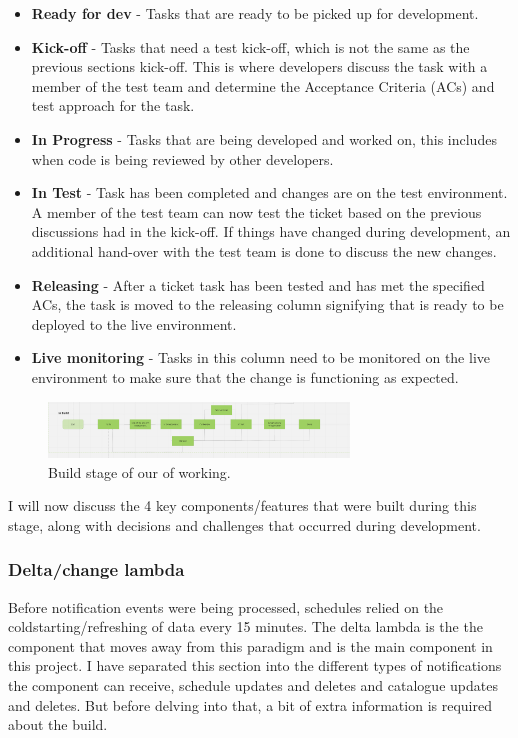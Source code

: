   \begin{itemize}
    \item \textbf{Ready for dev} - Tasks that are ready to be picked up for development.
    \item \textbf{Kick-off} - Tasks that need a test kick-off, which is not the same as the previous sections kick-off. This is where developers
    discuss the task with a member of the test team and determine the Acceptance Criteria (ACs) and test approach for the task.
    \item \textbf{In Progress} - Tasks that are being developed and worked on, this includes when code is being reviewed by other developers.
    \item \textbf{In Test} - Task has been completed and changes are on the test environment. A member of the test team can now test the ticket
    based on the previous discussions had in the kick-off. If things have changed during development, an additional hand-over with the test team 
    is done to discuss the new changes.
    \item \textbf{Releasing} - After a ticket task has been tested and has met the specified ACs, the task is moved to the releasing column signifying 
    that is ready to be deployed to the live environment.
    \item \textbf{Live monitoring} - Tasks in this column need to be monitored on the live environment to make sure that the change is functioning as expected.
  \end{itemize}

  \begin{figure}[H]
    \centering
    \includegraphics[width=8cm]{assets/workflow/build.png}
    \caption{Build stage of our of working.}
    \label{fig:workflowBuild}
  \end{figure}

  I will now discuss the 4 key components/features that were built during this stage, along with decisions and challenges that occurred during development.

  \newpage
  \subsubsection{Delta/change lambda}
  Before notification events were being processed, schedules relied on the coldstarting/refreshing of data every 15 minutes. The delta lambda is the 
  the component that moves away from this paradigm and is the main component in this project. I have separated this section into the different types
  of notifications the component can receive, schedule updates and deletes and catalogue updates and deletes. But before delving into that, a bit of extra
  information is required about the build.

